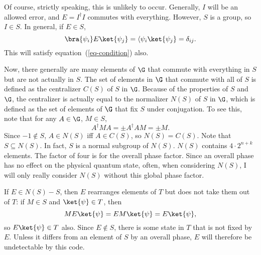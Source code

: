 Of course, strictly speaking, this is unlikely to occur.  Generally, $I$ will
be an allowed error, and $E = I^\dagger I$ commutes with everything.
However, $S$ is a group, so $I \in S$.  In general, if $E \in S$,
\begin{equation}
	\bra{\psi_i} E \ket{\psi_j} = \langle \psi_i \ket{\psi_j} = \delta_{ij}.
\end{equation}
This will satisfy equation~(\ref{eq-condition}) also.

Now, there generally are many elements of $\G$ that commute with
everything in $S$ but are not actually in $S$.  The set of elements in $\G$
that commute with all of $S$ is defined as the centralizer $C(S)$ of $S$ in
$\G$.  Because of the properties of $S$ and $\G$, the centralizer is actually
equal to the normalizer $N(S)$ of $S$ in $\G$, which is defined as the set of
elements of $\G$ that fix $S$ under conjugation.  To see this, note that for
any $A \in \G$, $M \in S$,
\begin{equation}
	A^\dagger M A = \pm A^\dagger A M = \pm M.
\end{equation}
Since $-1 \notin S$, $A \in N(S)$ iff $A \in C(S)$, so $N(S) = C(S)$.  Note
that $S \subseteq N(S)$.  In fact, $S$ is a normal subgroup of $N(S)$.
$N(S)$ contains $4 \cdot 2^{n+k}$ elements.  The factor of four is for the
overall phase factor.  Since an overall phase has no effect on the physical
quantum state, often, when considering $N(S)$, I will only really
consider $N(S)$ without this global phase factor.

If $E \in N(S)-S$, then $E$ rearranges elements of $T$ but does not take
them out of $T$: if $M \in S$ and $\ket{\psi} \in T$, then
\begin{equation}
	M E \ket{\psi} = EM \ket{\psi} = E \ket{\psi},
\end{equation}
so $E \ket{\psi} \in T$ also.  Since $E \notin S$, there is some state in $T$
that is not fixed by $E$.  Unless it differs from an element of $S$ by an
overall phase, $E$ will therefore be undetectable by this code.

